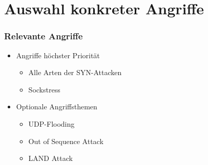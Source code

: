 \documentclass{beamer}
\begin{document}
\section{Auswahl konkreter Angriffe}
\begin{frame}
	\frametitle{Relevante Angriffe}
	\begin{itemize}
		\item Angriffe höchster Priorität
		      \begin{itemize}
			      \item Alle Arten der SYN-Attacken
			      \item Sockstress
		      \end{itemize}
		\item Optionale Angriffsthemen
		      \begin{itemize}
			      \item UDP-Flooding
			      \item Out of Sequence Attack
			      \item LAND Attack
		      \end{itemize}
	\end{itemize}
\end{frame}
\end{document}
